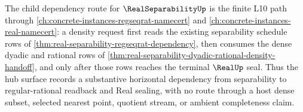 The child dependency route for $\RealSeparabilityUp$ is the finite L10 path through \autoref{ch:concrete-instances-regseqrat-namecert} and \autoref{ch:concrete-instances-real-namecert}: a density request first reads the existing separability schedule rows of \autoref{thm:real-separability-regseqrat-dependency}, then consumes the dense dyadic and rational rows of \autoref{thm:real-separability-dyadic-rational-density-handoff}, and only after those rows reaches the terminal $\RealUp$ seal. Thus the hub surface records a substantive horizontal dependency from separability to regular-rational readback and Real sealing, with no route through a host dense subset, selected nearest point, quotient stream, or ambient completeness claim.

